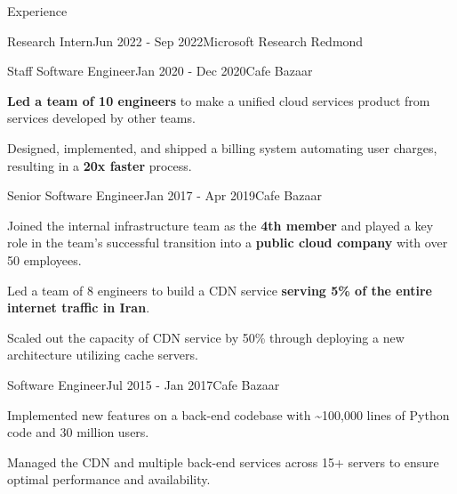 \documentclass[
	10pt, %
]{resume} %
\begin{document}
\begin{rSection}{Experience}
\begin{rSubsection}{Research Intern}{Jun 2022 - Sep 2022}{Microsoft Research Redmond}{}
	\end{rSubsection}

  \begin{rSubsection}{Staff Software Engineer}{Jan 2020 - Dec 2020}{Cafe Bazaar}{}

    \item \textbf{Led a team of 10 engineers} to make a uniﬁed cloud services product
      from services developed by other teams.

    \item Designed, implemented, and shipped a billing system automating user
      charges, resulting in a \textbf{20x faster} process.

  \end{rSubsection}

  \begin{rSubsection}{Senior Software Engineer}{Jan 2017 - Apr 2019}{Cafe Bazaar}{}

    \item Joined the internal infrastructure team as the \textbf{4th member} and
      played a key role in the team's successful transition into a
      \textbf{public cloud company} with over 50 employees.

    \item Led a team of 8 engineers to build a CDN service \textbf{serving 5\%
      of the entire internet traffic in Iran}.

    \item Scaled out the capacity of CDN service by 50\% through deploying a new
      architecture utilizing cache servers.

  \end{rSubsection}

  \begin{rSubsection}{Software Engineer}{Jul 2015 - Jan 2017}{Cafe Bazaar}{}
    
    \item Implemented new features on a back-end codebase with \textasciitilde 100,000 lines
      of Python code and 30 million users.

    \item Managed the CDN and multiple back-end services across 15+ servers to
      ensure optimal performance and availability.

  \end{rSubsection}

\end{rSection}

\end{document}
